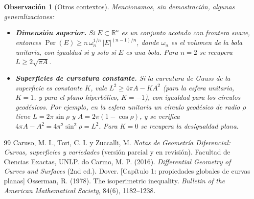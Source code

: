 \documentclass[12pt,a4paper]{article}
\theoremstyle{profesional}
\theoremstyle{definicion-style}
\newtheorem{observacion}[teorema]{Observación}
\newcommand{\R}{\mathbb{R}}
\newcommand{\abs}[1]{\left| #1 \right|}
\begin{document}
\begin{observacion}[Otros contextos]
    Mencionamos, sin demostración, algunas generalizaciones:
    \begin{itemize}[leftmargin=2em]
        \item \textbf{Dimensión superior.} Si \( E \subset \R^n \) es un conjunto acotado con frontera suave, entonces
              \( \operatorname{Per}(E) \geq n \, \omega_n^{1/n} \, \abs{E}^{(n-1)/n} \), donde \( \omega_n \) es el volumen de la bola unitaria, con igualdad si y solo si \( E \) es una bola. Para \( n = 2 \) se recupera \( L \geq 2\sqrt{\pi A} \).
        \item \textbf{Superficies de curvatura constante.} Si la curvatura de Gauss de la superficie es constante \( K \), vale \( L^2 \geq 4\pi A - K A^2 \) (para la esfera unitaria, \( K = 1 \), y para el plano hiperbólico, \( K = -1 \)), con igualdad para los círculos geodésicos.
              Por ejemplo, en la esfera unitaria un círculo geodésico de radio \( \rho \) tiene \( L = 2\pi \sin\rho \) y \( A = 2\pi (1 - \cos\rho) \), y se verifica \( 4\pi A - A^2 = 4\pi^2 \sin^2\rho = L^2 \).
              Para \( K = 0 \) se recupera la desigualdad plana.
    \end{itemize}
\end{observacion}

\newpage
\renewcommand{\refname}{Referencias Bibliográficas}

\begin{thebibliography}{99}
     Caruso, M. I., Tori, C. I. y Zuccalli, M. \textit{Notas de Geometría Diferencial: Curvas, superficies y variedades} (versión parcial y en revisión). Facultad de Ciencias Exactas, UNLP.
     do Carmo, M. P. (2016). \textit{Differential Geometry of Curves and Surfaces} (2nd ed.). Dover. [Capítulo 1: propiedades globales de curvas planas]
     Osserman, R. (1978). The isoperimetric inequality. \textit{Bulletin of the American Mathematical Society}, 84(6), 1182--1238.
\end{thebibliography}
\end{document}
